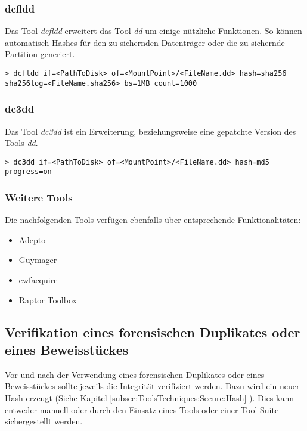 \subsubsection{dcfldd}
Das Tool \textit{dcfldd} erweitert das Tool \textit{dd} um einige nützliche Funktionen. So können automatisch Hashes für den zu sichernden Datenträger oder die zu sichernde Partition generiert.

\begin{lstlisting}
> dcfldd if=<PathToDisk> of=<MountPoint>/<FileName.dd> hash=sha256 sha256log=<FileName.sha256> bs=1MB count=1000
\end{lstlisting}


\subsubsection{dc3dd}
Das Tool \textit{dc3dd} ist ein Erweiterung, beziehungsweise eine gepatchte Version des Tools \textit{dd}.

\begin{lstlisting}
> dc3dd if=<PathToDisk> of=<MountPoint>/<FileName.dd> hash=md5 progress=on
\end{lstlisting}


\subsubsection{Weitere Tools}
Die nachfolgenden Tools verfügen ebenfalls über entsprechende Funktionalitäten:
\begin{itemize}
\item Adepto
\item Guymager
\item ewfacquire
\item Raptor Toolbox
\end{itemize}




\subsection{Verifikation eines forensischen Duplikates oder eines Beweisstückes}
Vor und nach der Verwendung eines forensischen Duplikates oder eines Beweisstückes sollte jeweils die Integrität verifiziert werden. Dazu wird ein neuer Hash erzeugt (Siehe Kapitel \ref{subsec:ToolsTechniques:Secure:Hash} ). Dies kann entweder manuell oder durch den Einsatz eines Tools oder einer Tool-Suite sichergestellt werden.

